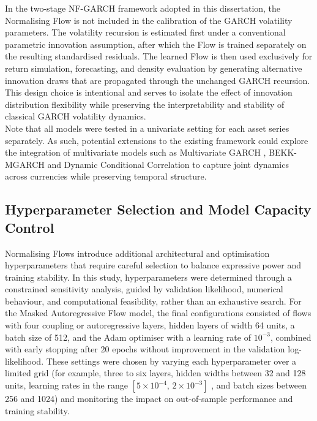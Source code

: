\documentclass[oneside,12pt]{CUEDthesisPSnPDF}
\newcommand{\textcite}{\citet}
\begin{document}
In the two-stage NF-GARCH framework adopted in this dissertation, the Normalising Flow is not included in the calibration of the GARCH volatility parameters. The volatility recursion is estimated first under a conventional parametric innovation assumption, after which the Flow is trained separately on the resulting standardised residuals. The learned Flow is then used exclusively for return simulation, forecasting, and density evaluation by generating alternative innovation draws that are propagated through the unchanged GARCH recursion. This design choice is intentional and serves to isolate the effect of innovation distribution flexibility while preserving the interpretability and stability of classical GARCH volatility dynamics.\\

Note that all models were tested in a univariate setting for each asset series separately. As such, potential extensions to the existing framework could explore the integration of multivariate models such as Multivariate GARCH \textcite{bollerslev1990modelling}, BEKK-MGARCH \textcite{engle1995multivariate} and Dynamic Conditional Correlation \textcite{engle2002dynamic} to capture joint dynamics across currencies while preserving temporal structure.\\


\subsection{Hyperparameter Selection and Model Capacity Control}
\label{subsec:hyperparams}
\noindent
Normalising Flows introduce additional architectural and optimisation hyperparameters that require careful selection to balance expressive power and training stability. In this study, hyperparameters were determined through a constrained sensitivity analysis, guided by validation likelihood, numerical behaviour, and computational feasibility, rather than an exhaustive search. For the Masked Autoregressive Flow model, the final configurations consisted of flows with four coupling or autoregressive layers, hidden layers of width 64 units, a batch size of 512, and the Adam optimiser with a learning rate of $10^{-3}$, combined with early stopping after 20 epochs without improvement in the validation log-likelihood. These settings were chosen by varying each hyperparameter over a limited grid (for example, three to six layers, hidden widths between 32 and 128 units, learning rates in the range $[5 \times 10^{-4},\, 2 \times 10^{-3}]$
, and batch sizes between 256 and 1024) and monitoring the impact on out-of-sample performance and training stability. \\
\end{document}
